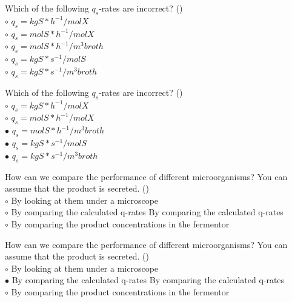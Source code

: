 \documentclass[]{beamer}
\begin{document}
\begin{frame}[shrink] {}
\addtocounter{questions}{1}
\color{blue}
Which of the following $q_s$-rates are incorrect? ()\\
\color{black}
\setlength{\parindent}{-0.4cm}
{\color{red}$\circ$} $q_s = kgS*h^{-1}/molX$ \\
{\color{red}$\circ$} $q_s = molS*h^{-1}/molX$ \\
{\color{red}$\circ$} $q_s = molS*h^{-1}/m^{3}broth$ \\
{\color{red}$\circ$} $q_s = kgS*s^{-1}/molS$ \\
{\color{red}$\circ$} $q_s = kgS*s^{-1}/m^{3}broth$ \\
\end{frame}
\begin{frame}[shrink] {}
\addtocounter{answers}{1}
\color{blue}
Which of the following $q_s$-rates are incorrect? ()\\
\color{black}
\setlength{\parindent}{-0.4cm}
{\color{red}$\circ$} $q_s = kgS*h^{-1}/molX$ \\
{\color{red}$\circ$} $q_s = molS*h^{-1}/molX$ \\
{\color{red}$\bullet$} $q_s = molS*h^{-1}/m^{3}broth$ \\
{\color{red}$\bullet$} $q_s = kgS*s^{-1}/molS$ \\
{\color{red}$\bullet$} $q_s = kgS*s^{-1}/m^{3}broth$ \\
\end{frame}

\begin{frame}[shrink] {}
\addtocounter{questions}{1}
\color{blue}
How can we compare the performance of different microorganisms? You can assume that the product is secreted. ()\\
\color{black}
\setlength{\parindent}{-0.4cm}
{\color{red}$\circ$}  By looking at them under a microscope\\
{\color{red}$\circ$} By comparing the calculated q-rates By comparing the calculated q-rates \\
{\color{red}$\circ$} By comparing the product concentrations in the fermentor \\
\end{frame}
\begin{frame}[shrink] {}
\addtocounter{answers}{1}
\color{blue}
How can we compare the performance of different microorganisms? You can assume that the product is secreted. ()\\
\color{black}
\setlength{\parindent}{-0.4cm}
{\color{red}$\circ$}  By looking at them under a microscope\\
{\color{red}$\bullet$} By comparing the calculated q-rates By comparing the calculated q-rates \\
{\color{red}$\circ$} By comparing the product concentrations in the fermentor \\
\end{frame}
\end{document}
